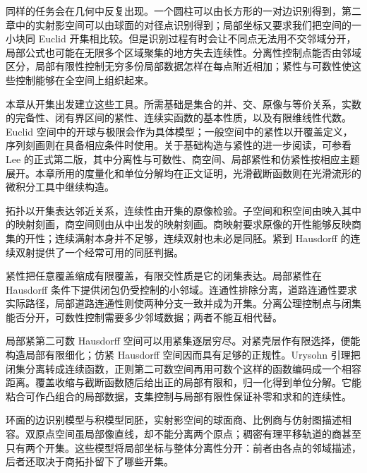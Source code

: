 \ProseParagraphBreak

同样的任务会在几何中反复出现。一个圆柱可以由长方形的一对边识别得到，第二章中的实射影空间可以由球面的对径点识别得到；局部坐标又要求我们把空间的一小块同 Euclid 开集相比较。但是识别过程有时会让不同点无法用不交邻域分开，局部公式也可能在无限多个区域聚集的地方失去连续性。分离性控制点能否由邻域区分，局部有限性控制无穷多份局部数据怎样在每点附近相加；紧性与可数性使这些控制能够在全空间上组织起来。

\ProseParagraphBreak

本章从开集出发建立这些工具。所需基础是集合的并、交、原像与等价关系，实数的完备性、闭有界区间的紧性、连续实函数的基本性质，以及有限维线性代数。Euclid 空间中的开球与极限会作为具体模型；一般空间中的紧性以开覆盖定义，序列刻画则在具备相应条件时使用。关于基础构造与紧性的进一步阅读，可参看 Lee 的正式第二版\cite[第2章, 第19--37页; 第3章, 第49--80页; 第4章, 第86--117页]{Lee2011Topological}，其中分离性与可数性、商空间、局部紧性和仿紧性按相应主题展开。本章所用的度量化和单位分解均在正文证明，光滑截断函数则在光滑流形的微积分工具中继续构造。







\begin{chaptersummary}
	拓扑以开集表达邻近关系，连续性由开集的原像检验。子空间和积空间由映入其中的映射刻画，商空间则由从中出发的映射刻画。商映射要求原像的开性能够反映商集的开性；连续满射本身并不足够，连续双射也未必是同胚。紧到 Hausdorff 的连续双射提供了一个经常可用的同胚判据。

	\ProseParagraphBreak

	紧性把任意覆盖缩成有限覆盖，有限交性质是它的闭集表达。局部紧性在 Hausdorff 条件下提供闭包仍受控制的小邻域。连通性排除分离，道路连通性要求实际路径，局部道路连通性则使两种分支一致并成为开集。分离公理控制点与闭集能否分开，可数性控制需要多少邻域数据；两者不能互相代替。

	\ProseParagraphBreak

	局部紧第二可数 Hausdorff 空间可以用紧集逐层穷尽。对紧壳层作有限选择，便能构造局部有限细化；仿紧 Hausdorff 空间因而具有足够的正规性。Urysohn 引理把闭集分离转成连续函数，正则第二可数空间再用可数个这样的函数编码成一个相容距离。覆盖收缩与截断函数随后给出正的局部有限和，归一化得到单位分解。它能粘合可作凸组合的局部数据，支集控制与局部有限性保证补零和求和的连续性。

	\ProseParagraphBreak

	环面的边识别模型与积模型同胚，实射影空间的球面商、比例商与仿射图描述相容。双原点空间虽局部像直线，却不能分离两个原点；稠密有理平移轨道的商甚至只有两个开集。这些模型将局部坐标与整体分离性分开：前者由各点的邻域描述，后者还取决于商拓扑留下了哪些开集。
\end{chaptersummary}

